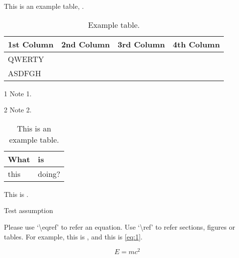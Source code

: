 \begin{tempsection}
    This is an example table, .
    \begin{table}[htbp]
        \begin{center}
        \begin{threeparttable}
            \caption{Example table.\label{tb:this_is_table}}
            \centering
            \begin{tabular}{l c c c}
                \toprule
                \textbf{1st Column} & \textbf{2nd Column} & \textbf{3rd Column} & \textbf{4th Column} \\
                \midrule
                QWERTY\tnote{1}     &                     &                     &                     \\
                ASDFGH\tnote{2}     &                     &                     &                     \\
                \bottomrule
            \end{tabular}
            \begin{tablenotes}
                \item [1] Note 1.
                \item [2] Note 2.
            \end{tablenotes}
        \end{threeparttable}
        \end{center}
    \end{table}

    \begingroup
    \begin{table}
        \centering
        \caption{This is an example table.}\label{tbl:nicetablelesstable}
        \begin{tabular}{ll}
            What & is     \\
            \hline
            this & doing? \\
        \end{tabular}
    \end{table}
    \endgroup

    This is .
    \begin{assumption}\label{ass:ass1}
        Test assumption
    \end{assumption}

    Please use `\textbackslash eqref' to refer an equation. Use `\textbackslash ref' to refer sections, figures or tables. For example, this is , and this is \eqref{eq:1}.

    \begin{equation}
        E = mc^2
        \label{eq:1}
    \end{equation}

\end{tempsection}